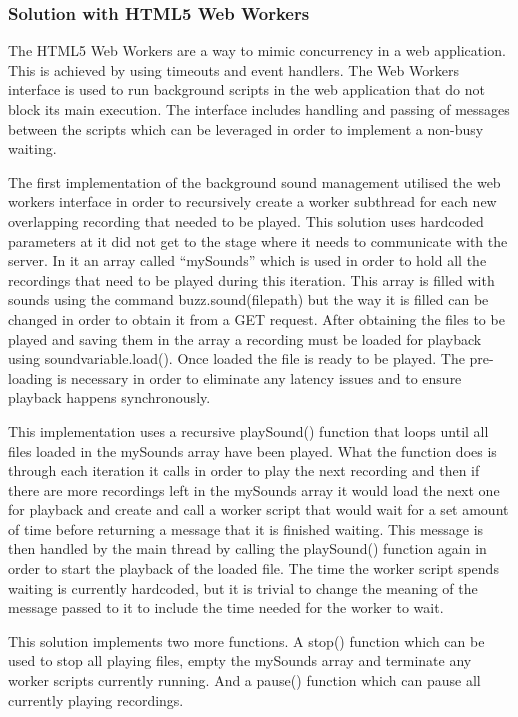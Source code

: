 \documentclass{l3proj}
\begin{document}
\subsubsection{Solution with HTML5 Web Workers}
The HTML5 Web Workers are a way to mimic concurrency in a web application. This is achieved by using timeouts and event handlers. The Web Workers interface is used to run background scripts in the web application that do not block its main execution. The interface includes handling and passing of messages between the scripts which can be leveraged in order to implement a non-busy waiting.

The first implementation of the background sound management utilised the web workers interface in order to recursively create a worker subthread for each new overlapping recording that needed to be played. This solution uses hardcoded parameters at it did not get to the stage where it needs to communicate with the server. In it an array called “mySounds” which is used in order to hold all the recordings that need to be played during this iteration. This array is filled with sounds using the command buzz.sound(filepath) but the way it is filled can be changed in order to obtain it from a GET request. After obtaining the files to be played and saving them in the array a recording must be loaded for playback using soundvariable.load(). Once loaded the file is ready to be played. The pre-loading is necessary in order to eliminate any latency issues and to ensure playback happens synchronously.

This implementation uses a recursive playSound() function that loops until all files loaded in the mySounds array have been played. What the function does is through each iteration it calls  in order to play the next recording and then if there are more recordings left in the mySounds array it would load the next one for playback and create and call a worker script that would wait for a set amount of time before returning a message that it is finished waiting. This message is then handled by the main thread by calling the playSound() function again in order to start the playback of the loaded file. The time the worker script spends waiting is currently hardcoded, but it is trivial to change the meaning of the message passed to it to include the time needed for the worker to wait.

This solution implements two more functions. A stop() function which can be used to stop all playing files, empty the mySounds array and terminate any worker scripts currently running. And a pause() function which can pause all currently playing recordings.
\end{document}
